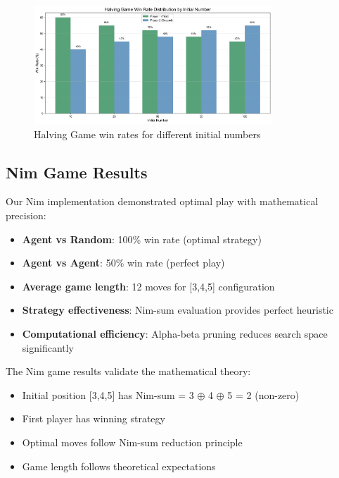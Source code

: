 \documentclass[12pt]{article}
\begin{document}
\begin{figure}[H]
\centering
\includegraphics[width=0.8\textwidth]{output/images/halving_win_rates.png}
\caption{Halving Game win rates for different initial numbers}
\label{fig:halving_win_rates}
\end{figure}

\subsection{Nim Game Results}

Our Nim implementation demonstrated optimal play with mathematical precision:
\begin{itemize}
    \item \textbf{Agent vs Random}: 100\% win rate (optimal strategy)
    \item \textbf{Agent vs Agent}: 50\% win rate (perfect play)
    \item \textbf{Average game length}: 12 moves for [3,4,5] configuration
    \item \textbf{Strategy effectiveness}: Nim-sum evaluation provides perfect heuristic
    \item \textbf{Computational efficiency}: Alpha-beta pruning reduces search space significantly
\end{itemize}

The Nim game results validate the mathematical theory:
\begin{itemize}
    \item Initial position [3,4,5] has Nim-sum = 3 $\oplus$ 4 $\oplus$ 5 = 2 (non-zero)
    \item First player has winning strategy
    \item Optimal moves follow Nim-sum reduction principle
    \item Game length follows theoretical expectations
\end{itemize}
\end{document}
